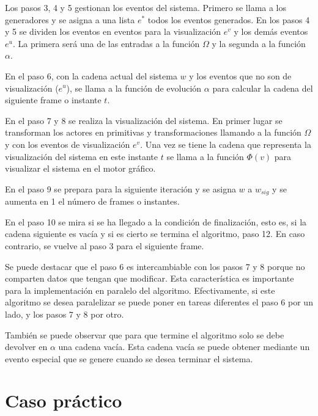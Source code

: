 \documentclass{egpubl}
\begin{document}
Los pasos 3, 4 y 5 gestionan los eventos del sistema. Primero se llama a los generadores y se asigna a una lista $e^{*}$ todos los eventos generados. En los pasos 4 y 5 se dividen los eventos en eventos para la visualizaci\'on $e^{v}$ y los dem\'as eventos $e^{u}$. La primera ser\'a una de las entradas a la funci\'on $\Omega$ y la segunda a la funci\'on $\alpha$.

En el paso 6, con la cadena actual del sistema $w$ y los eventos que no son de visualizaci\'on ($e^{u}$), se llama a la funci\'on de evoluci\'on $\alpha$ para calcular la cadena del siguiente frame o instante $t$.

En el paso 7 y 8 se realiza la visualizaci\'on del sistema. En primer lugar se transforman los actores en primitivas y transformaciones llamando a la funci\'on $\Omega$ y con los eventos de visualizaci\'on $e^{v}$. Una vez se tiene la cadena que representa la visualizaci\'on del sistema en este instante $t$ se llama a la funci\'on $\Phi(v)$ para visualizar el sistema en el motor gr\'afico.

En el paso 9 se prepara para la siguiente iteraci\'on y se asigna $w$ a $w_{sig}$ y se aumenta en 1 el n\'umero de frames o instantes.

En el paso 10 se mira si se ha llegado a la condici\'on de finalizaci\'on, esto es, si la cadena siguiente es vac\'ia y si es cierto se termina el algoritmo, paso 12. En caso contrario, se vuelve al paso 3 para el siguiente frame.

Se puede destacar que el paso 6 es intercambiable con los pasos 7 y 8 porque no comparten datos que tengan que modificar. Esta caracter\'istica es importante para la implementaci\'on en paralelo del algoritmo. Efectivamente, si este algoritmo se desea paralelizar se puede poner en tareas diferentes el paso 6 por un lado, y los pasos 7 y 8 por otro.

Tambi\'en se puede observar que para que termine el algoritmo solo se debe devolver en $\alpha$ una cadena vac\'ia. Esta cadena vac\'ia se puede obtener mediante un evento especial que se genere cuando se desea terminar el sistema.


\section{Caso pr\'actico
\label{sec:caso_practico}}
\end{document}
